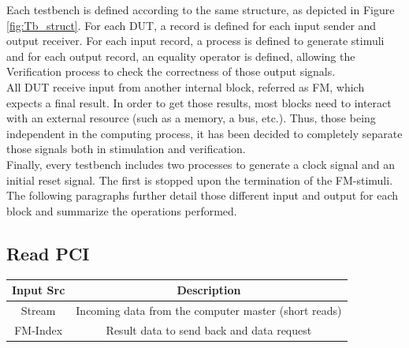 Each testbench is defined according to the same structure, as depicted in Figure \ref{fig:Tb_struct}. For each DUT, a record is defined for each input sender and output receiver. For each input record, a process is defined to generate stimuli and for each output record, an equality operator is defined, allowing the \textrm{Verification} process to check the correctness of those output signals. \\
All DUT receive input from another internal block, referred as FM, which expects a final result. In order to get those results, most blocks need to interact with an external resource (such as a memory, a bus, etc.). Thus, those being independent in the computing process, it has been decided to completely separate those signals both in stimulation and verification. \\

Finally, every testbench includes two processes to generate a clock signal and an initial reset signal. The first is stopped upon the termination of the FM-stimuli. \\

The following paragraphs further detail those different input and output for each block and summarize the operations performed.


\subsection{Read PCI}
\vspace*{3mm}
\begin{center}
    \begin{tabular}{|c|c|}
\hline
  Input Src   &  Description \\
  \hline
   Stream  & Incoming data from the computer master (short reads) \\
   FM-Index & Result data to send back and data request \\
   \hline
\end{tabular}
\end{center}
\vspace*{5mm}

